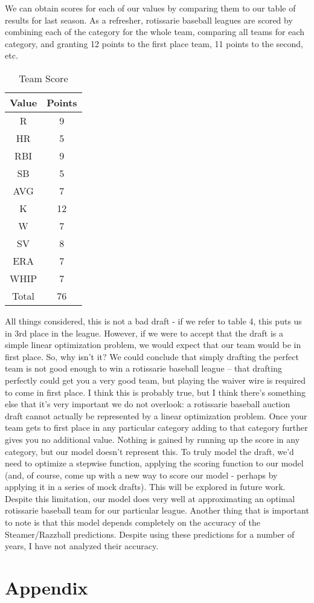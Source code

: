 \documentclass{article}
\begin{document}
We can obtain scores for each of our values by comparing them to our table of results for last season. As a refresher, rotissarie baseball leagues are scored by combining each of the category for the whole team, comparing all teams for each category, and granting 12 points to the first place team, 11 points to the second, etc. 

\begin{table}[ht] \caption{Team Score}
\centering 
\begin{tabular}{c c}
\hline\hline
Value & Points \\
\hline
R & 9 \\
HR & 5 \\
RBI & 9 \\
SB & 5 \\
AVG & 7 \\
K & 12 \\
W & 7 \\
SV & 8 \\
ERA & 7 \\
WHIP & 7 \\
\hline
Total & 76 \\
[1ex] 
\hline
\end{tabular}
\end{table}
\newpage
All things considered, this is not a bad draft - if we refer to table 4, this puts us in 3rd place in the league. However, if we were to accept that the draft is a simple linear optimization problem, we would expect that our team would be in first place. So, why isn't it? We could conclude that simply drafting the perfect team is not good enough to win a rotissarie baseball league -- that drafting perfectly could get you a very good team, but playing the waiver wire is required to come in first place. I think this is probably true, but I think there's something else that it's very important we do not overlook: a rotissarie baseball auction draft cannot actually be represented by a linear optimization problem. Once your team gets to first place in any particular category adding to that category further gives you no additional value. Nothing is gained by running up the score in any category, but our model doesn't represent this. To truly model the draft, we'd need to optimize a stepwise function, applying the scoring function to our model (and, of course, come up with a new way to score our model - perhaps by applying it in a series of mock drafts). This will be explored in future work. Despite this limitation, our model does very well at approximating an optimal rotissarie baseball team for our particular league. Another thing that is important to note is that this model depends completely on the accuracy of the Steamer/Razzball predictions. Despite using these predictions for a number of years, I have not analyzed their accuracy.
\newpage
\appendix
\section*{Appendix}
\end{document}
